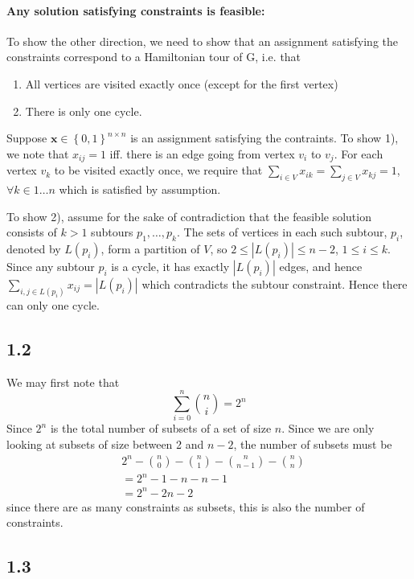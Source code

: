 \documentclass[12pt]{article}
\begin{document}
\paragraph{Any solution satisfying constraints is feasible:}
To show the other direction, we need to show that an assignment satisfying the constraints correspond to a Hamiltonian tour of G, i.e. that
\begin{enumerate}
\item All vertices are visited exactly once (except for the first vertex)
\item There is only one cycle.
\end{enumerate}
Suppose $\mathbf{x} \in \left\{0,1\right\}^{n \times n}$ is an assignment satisfying the contraints. To show 1), we note that $x_{ij}=1$ iff. there is an edge going from vertex $v_{i}$ to $v_{j}$. For each vertex $v_{k}$ to be visited exactly once, we require that $\sum_{i \in V} x_{ik} = \sum_{j \in V} x_{kj} = 1$, $\forall k \in 1 \hdots n$ which is satisfied by assumption.

To show 2), assume for the sake of contradiction that the feasible solution consists of $k>1$ subtours $p_{1}, \hdots , p_{k}$. The sets of vertices in each such subtour, $p_{i}$, denoted by $L(p_{i})$, form a partition of $V$, so $2 \leq \left| L(p_{i}) \right| \leq n-2$, $1 \leq i \leq k$. Since any subtour $p_{i}$ is a cycle, it has exactly $|L(p_i)|$ edges, and hence $\sum_{i,j \in L(p_{i})} x_{ij} = |L(p_{i})|$ which contradicts the subtour constraint. Hence there can only one cycle.


\subsection*{1.2}

We may first note that 
$$
\sum_{i=0}^n\binom{n}{i} = 2^n
$$
Since $2^n$ is the total number of subsets of a set of size $n$. Since we are only looking at subsets of size between 2 and $n-2$, the number of subsets must be 
\begin{align*}
&2^n - \binom{n}{0} - \binom{n}{1} - \binom{n}{n-1} - \binom{n}{n} \\
&=2^n - 1 - n - n - 1 \\
&= 2^n - 2n - 2 
\end{align*}
since there are as many constraints as subsets, this is also the number of constraints.

\subsection*{1.3}
\end{document}
